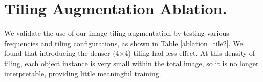 % 
\clearpage
\section{Tiling Augmentation Ablation.}\label{append_tile}
We validate the use of our image tiling augmentation by testing various frequencies and tiling configurations, as shown in Table \ref{ablation_tile2}. 
We found that introducing the denser (4$\times$4) tiling had less effect. 
At this density of tiling, each object instance is very small within the total image, so it is no longer interpretable, providing little meaningful training. 
\begin{table}[!h]
    \centering
    \fontsize{9}{9}\selectfont
    
    \caption{Performance results for varying sizes and frequencies of our tiling augmentation on FSC-147. Images are tiled in either a (2$\times$2) grid, or in one of a (4$\times$4) or (2$\times$2) grid with equal probability.
    }
    \label{ablation_tile2}
\end{table}
